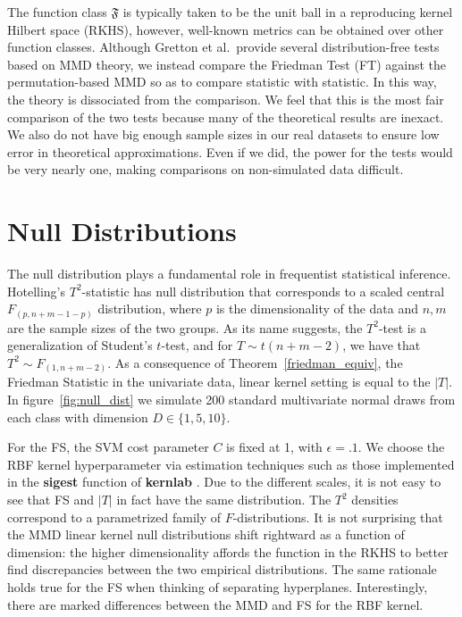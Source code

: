 The function class $\mathfrak{F}$ is typically taken to be the unit ball in a
reproducing kernel Hilbert space (RKHS), however, well-known metrics
can be obtained over other function classes.  Although Gretton et
al.\ provide several distribution-free tests based on MMD theory, we
instead compare the Friedman Test (FT) against the permutation-based
MMD so as to compare statistic with statistic.  In this way, the
theory is dissociated from the comparison.  We feel that this is the
most fair comparison of the two tests because many of the theoretical
results are inexact.  We also do not have big enough sample sizes in
our real datasets to ensure low error in theoretical approximations.
Even if we did, the power for the tests would be very nearly one,
making comparisons on non-simulated data difficult.

\section{Null Distributions}
The null distribution plays a fundamental role in frequentist statistical
inference.  Hotelling's $T^2$-statistic has null distribution that
corresponds to a scaled central $F_{(p, n+m-1-p)}$ distribution, where
$p$ is the dimensionality of the data and $n, m$ are the sample sizes
of the two groups.  As its name suggests, the $T^2$-test is a
generalization of Student's $t$-test, and for $T \sim t(n+m-2)$, we
have that $T^2 \sim F_{(1, n+m-2)}$.  As a consequence of
Theorem~\ref{friedman_equiv}, the Friedman Statistic in the univariate
data, linear kernel setting is equal to the $|T|$.  In figure~\ref{fig:null_dist} we simulate
200 standard multivariate normal draws from each class with dimension
$D \in \{1, 5, 10\}$.

For the FS, the SVM cost parameter $C$ is fixed at 1, with $\epsilon =
.1$.  We choose the RBF kernel hyperparameter via estimation
techniques such as those implemented in the {\bf sigest} function of 
{\bf kernlab} \cite{kernlab}.  Due to the different
scales, it is not easy to see that FS and
$|T|$ in fact have the same distribution.  The $T^2$ densities correspond to a
parametrized family of $F$-distributions.  It is not surprising that the MMD
linear kernel null distributions shift rightward as a function of
dimension: the higher dimensionality affords the function in the RKHS
to better find discrepancies between the two empirical distributions.
The same rationale holds true for the FS when thinking of separating
hyperplanes.  Interestingly, there are marked differences between the
MMD and FS for the RBF kernel.


